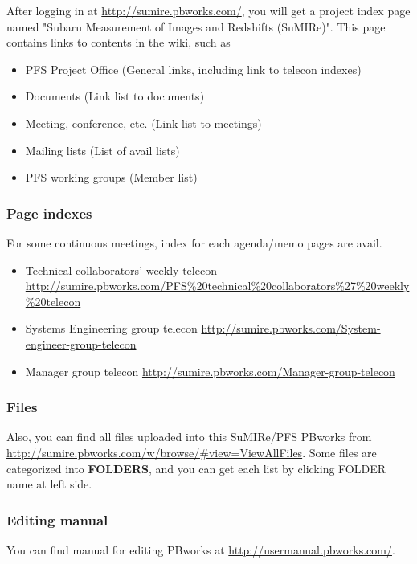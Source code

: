 \documentclass[a4paper,notitlepage]{article}
\begin{document}
After logging in at \url{http://sumire.pbworks.com/}, 
you will get a project index page named 
"Subaru Measurement of Images and Redshifts (SuMIRe)". 
This page contains links to contents in the wiki, such as 

\begin{itemize}
  \item PFS Project Office (General links, including link to telecon indexes)
  \item Documents (Link list to documents)
  \item Meeting, conference, etc.  (Link list to meetings)
  \item Mailing lists (List of avail lists)
  \item PFS working groups (Member list)
\end{itemize}

\subsubsection{Page indexes}

For some continuous meetings, index for each agenda/memo pages are avail.

\begin{itemize}
  \item Technical collaborators' weekly telecon \url{http://sumire.pbworks.com/PFS%20technical%20collaborators%27%20weekly%20telecon}
  \item Systems Engineering group telecon \url{http://sumire.pbworks.com/System-engineer-group-telecon}
  \item Manager group telecon \url{http://sumire.pbworks.com/Manager-group-telecon}
\end{itemize}


\subsubsection{Files}

Also, you can find all files uploaded into this SuMIRe/PFS PBworks from 
\url{http://sumire.pbworks.com/w/browse/#view=ViewAllFiles}.
Some files are categorized into {\bf FOLDERS}, and you can get each list by 
clicking FOLDER name at left side. 

\subsubsection{Editing manual}

You can find manual for editing PBworks at 
\url{http://usermanual.pbworks.com/}. 
\end{document}
